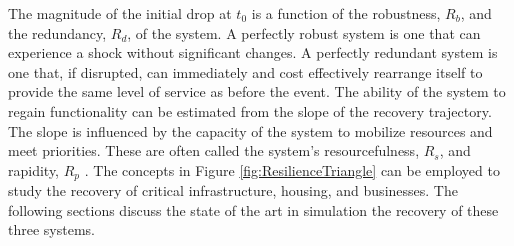\begin{partbacktext}
The magnitude of the initial drop at $t_0$ is a function of the robustness, $R_b$, and the redundancy, $R_d$, of the system. A perfectly robust system is one that can experience a shock without significant changes. A perfectly redundant system is one that, if disrupted, can immediately and cost effectively rearrange itself to provide the same level of service as before the event. The ability of the system to regain functionality can be estimated from the slope of the recovery trajectory. The slope is influenced by the capacity of the system to mobilize resources and meet priorities. These are often called the system's resourcefulness, $R_s$, and rapidity, $R_p$ \citep{Bruneau2003}. The concepts in Figure \ref{fig:ResilienceTriangle} can be employed to study the recovery of critical infrastructure, housing, and businesses. The following sections discuss the state of the art in simulation the recovery of these three systems.\

\FloatBarrier
\end{partbacktext}
